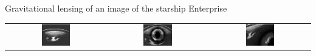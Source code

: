 \documentclass[aspectratio=1610,xcolor=dvipsnames,t]{beamer}
\begin{document}

\begin{frame}{Gravitational lensing of an image of the starship Enterprise} 
    \begin{center}
        \begin{tabular}{ccc}
            \includegraphics[width=0.3\textwidth]{pics/1701.eps} &
            \includegraphics[width=0.3\textwidth]{pics/ent_2e30.eps} &
            \includegraphics[width=0.3\textwidth]{pics/ent_1e31.eps} 
        \end{tabular}
    \end{center}
\end{frame} 

\end{document}
